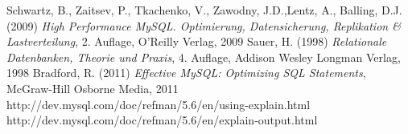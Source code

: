 \newpage
{}
  \begin{thebibliography}{}



     Schwartz, B., Zaitsev, P., Tkachenko, V., Zawodny, J.D.,Lentz, A., Balling, D.J. (2009) 
     {\sl High Performance MySQL. Optimierung, Datensicherung, Replikation \& Lastverteilung}, 2. Auflage,  O'Reilly Verlag, 2009
     Sauer, H. (1998) {\sl Relationale Datenbanken, Theorie und Praxis}, 4. Auflage, Addison Wesley Longman Verlag, 1998
     Bradford, R. (2011) {\sl Effective MySQL: Optimizing SQL Statements}, McGraw-Hill Osborne Media, 2011
	 http://dev.mysql.com/doc/refman/5.6/en/using-explain.html
	 http://dev.mysql.com/doc/refman/5.6/en/explain-output.html

  \end{thebibliography}

 